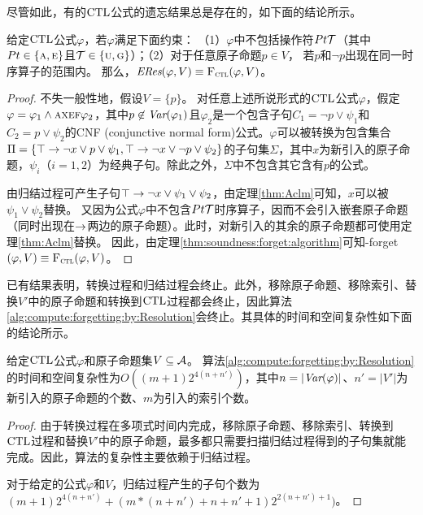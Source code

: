 尽管如此，有的$\textrm{CTL}$公式的遗忘结果总是存在的，如下面的结论所示。
\begin{proposition} \label{pro:fogCTL}
	给定$\textrm{CTL}$公式$\varphi$，若$\varphi$满足下面约束：
	（1）$\varphi$中不包括操作符$Pt {\cal T}$（其中$Pt \in \{\textsc{a}, \textsc{e}\}$且${\cal T} \in \{\textsc{u}, \textsc{g}\}$）；（2）对于任意原子命题$p\in V$， 若$p$和$\neg p$出现在同一时序算子的范围内。
	那么，$\emph{ERes}(\varphi,V) \equiv {\textsc{F}_{\textsc{ctl}}}(\varphi, V)$。
\end{proposition}
\begin{proof}
	不失一般性地，假设$V = \{p\}$。
	对任意上述所说形式的$\textrm{CTL}$公式$\varphi$，假定$\varphi = \varphi_1 \wedge \textsc{a} \textsc{x} \textsc{e} \textsc{f} \varphi_2$，其中$p\not \in \textit{Var}(\varphi_1)$且$\varphi_2$是一个包含子句$C_1 = \neg p \vee \psi_1$和$C_2 = p \vee \psi_2$的CNF (conjunctive normal form)公式。$\varphi$可以被转换为包含集合$\Pi = \{\top \rightarrow \neg x \vee p \vee  \psi_1,  \top \rightarrow \neg x \vee \neg p \vee \psi_2\}$的子句集$\Sigma$，其中$x$为新引入的原子命题，$\psi_i$（$i=1,2$）为经典子句。除此之外，$\Sigma$中不包含其它含有$p$的公式。
	
	由归结过程可产生子句$\top \rightarrow \neg x \vee \psi_1 \vee \psi_2$，由定理\ref{thm:Aclm}可知，$x$可以被$\psi_1 \vee \psi_2$替换。
	又因为公式$\varphi$中不包含$Pt {\cal T}$时序算子，因而不会引入嵌套原子命题（同时出现在$\rightarrow$两边的原子命题）。此时，对新引入的其余的原子命题都可使用定理\ref{thm:Aclm}替换。
	因此，由定理\ref{thm:soundness:forget:algorithm}可知\CTL-forget$(\varphi,V)\equiv {\textsc{F}_{\textsc{ctl}}}(\varphi, V)$。
\end{proof}




\label{chp4:sect:complex}
已有结果表明，转换过程和归结过程会终止\cite{zhang2014resolution}。此外，移除原子命题、移除索引、替换$V'$中的原子命题和转换到$\textrm{CTL}$过程都会终止，因此算法\ref{alg:compute:forgetting:by:Resolution}会终止。其具体的时间和空间复杂性如下面的结论所示。


\begin{proposition}\label{pro:complexity}
	给定$\textrm{CTL}$公式$\varphi$和原子命题集$V \subseteq {\cal A}$。
	算法\ref{alg:compute:forgetting:by:Resolution}的时间和空间复杂性为$O((m+1)2^{4(n+n')})$，其中$n=|\textit{Var}(\varphi)|$、$n'=|V'|$为新引入的原子命题的个数、$m$为引入的索引个数。
\end{proposition}
\begin{proof}
	由于转换过程在多项式时间内完成，移除原子命题、移除索引、转换到$\textrm{CTL}$过程和替换$V'$中的原子命题，最多都只需要扫描归结过程得到的子句集就能完成。因此，算法的复杂性主要依赖于归结过程。
	
	对于给定的公式$\varphi$和$V$，归结过程产生的子句个数为$(m+1)2^{4(n+n')}+(m*(n+n')+n+n'+1)2^{2(n+n')+1})$。
\end{proof}

